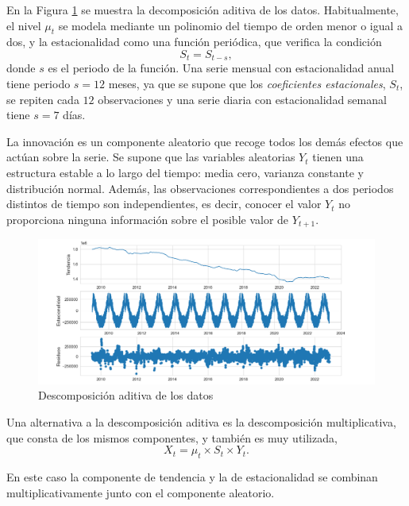 \documentclass[12pt,twoside]{article}
\begin{document}
En la Figura \ref{fig:Decomposition} se muestra la decomposición aditiva  de los datos. Habitualmente, el nivel $\mu_t$ se modela mediante un polinomio del tiempo de orden menor o igual a dos, y la estacionalidad como una función periódica, que verifica la condición
\begin{equation*}
    S_t = S_{t-s},
\end{equation*}
donde $s$ es el periodo de la función. Una serie mensual con estacionalidad anual tiene periodo $s=12$ meses, ya que se supone que los \emph{coeficientes estacionales}, $S_t$, se repiten cada $12$ observaciones y una serie diaria con estacionalidad semanal tiene $s=7$ días.

La innovación es un componente aleatorio que recoge todos los demás efectos que actúan sobre la serie. Se supone que las variables aleatorias $Y_t$ tienen una estructura estable a lo largo del tiempo: media cero, varianza constante y distribución normal. Además, las observaciones correspondientes a dos periodos distintos de tiempo son independientes, es decir, conocer el valor $Y_t$ no proporciona ninguna información sobre el posible valor de $Y_{t+1}$.



\begin{figure} 
    \includegraphics[width = \textwidth]{imagenes/Decomposition.png}
    \caption{Descomposición aditiva de los datos}\label{fig:Decomposition}
\end{figure}



Una alternativa a la descomposición aditiva es la descomposición multiplicativa, que consta de los mismos componentes, y también es muy utilizada, 
\begin{equation}\label{eq:descom3}
    X_t = \mu_t \times S_t \times Y_t.
\end{equation}

En este caso la componente de tendencia y la de estacionalidad se combinan multiplicativamente junto con el componente aleatorio.
\end{document}
